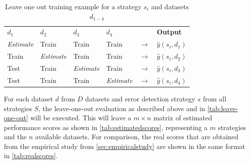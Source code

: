  \begin{table}[H]
\centering
\begin{tabular}{|l|l|l|l|l|l|}
\cline{1-4} \cline{6-6}
\textbf{$d_1$} & \textbf{$d_2$} & \textbf{$d_3$} & \textbf{$d_4$} &                 & \textbf{Output} \\ \cline{1-4} \cline{6-6} 
\textit{Estimate}          & Train         & Train         & Train         & $\rightarrow$ & $\hat{y}(s_i, d_1)$      \\ \cline{1-4} \cline{6-6} 
Train         & \textit{Estimate}          & Train         & Train         & $\rightarrow$ & $\hat{y}(s_i, d_2)$      \\ \cline{1-4} \cline{6-6} 
Test          & Train         & \textit{Estimate}          & Train         & $\rightarrow$ & $\hat{y}(s_i, d_3)$     \\ \cline{1-4} \cline{6-6} 
Test          & Train         & Train         & \textit{Estimate}          & $\rightarrow$ & $\hat{y}(s_i, d_4)$      \\ \cline{1-4} \cline{6-6} 
\end{tabular}
\caption{Leave one out training example for a strategy $s_i$ and datasets $d_{1-4}$}
\label{tab:leave-one-out}
\end{table}

For each dataset $d$ from $D$ datasets and error detection strategy $s$ from all strategies $S$, the leave-one-out evaluation as described above and in \autoref{tab:leave-one-out} will be executed. This will leave a $m \times n$ matrix of estimated performance scores as shown in \autoref{tab:estimatedscores}, representing a $m$ strategies and the $n$ available datasets.
For comparison, the real scores that are obtained from the empirical study from \autoref{sec:empiricalstudy} are shown in the same format in \autoref{tab:realscores}.

